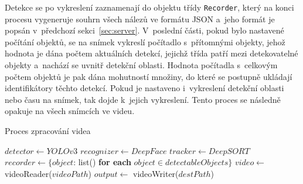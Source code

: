 Detekce se po vykreslení zaznamenají do objektu třídy \texttt{Recorder}, který na konci procesu vygeneruje souhrn všech nálezů ve formátu JSON a~jeho formát je popsán v~předchozí sekci~\ref{sec:server}. V~poslední části, pokud bylo nastavené počítání objektů, se na snímek vykreslí počítadlo s~přítomnými objekty, jehož hodnota je dána počtem aktuálních detekcí, jejichž třída patří mezi detekovatelné objekty a~nachází se uvnitř detekční oblasti. Hodnota počítadla s~celkovým počtem objektů je pak dána mohutností množiny, do které se postupně ukládají identifikátory těchto detekcí. Pokud je nastaveno i~vykreslení detekční oblasti nebo času na snímek, tak dojde k~jejich vykreslení. Tento proces se následně opakuje na všech snímcích ve videu.

\begin{algorithm}
\caption{Proces zpracování videa}
\label{alg:ProcesZpracováníVidea}
\begin{algorithmic}[1]
    \State $detector \gets YOLOv3$    
    \State $recognizer \gets DeepFace$
    \State $tracker \gets DeepSORT$
    \State $recorder \gets \{object$: list() \textbf{for each} $object \in detectableObjects\}$
    \State $video \gets$ videoReader($videoPath$)     
    \State $output \gets$ videoWriter($destPath$)


\end{algorithmic}
\end{algorithm}
